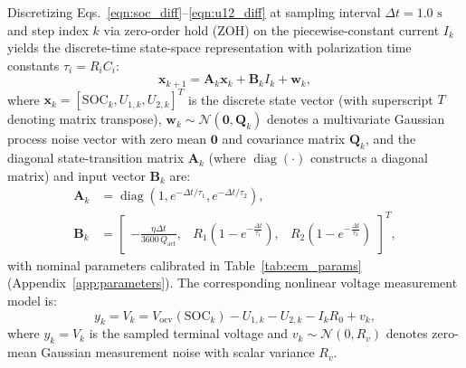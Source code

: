 \documentclass[10pt,a4paper]{article}
\begin{document}
Discretizing Eqs.~\eqref{eqn:soc_diff}--\eqref{eqn:u12_diff} at sampling interval $\Delta t = 1.0\text{ s}$ and step index $k$ via zero-order hold (ZOH) on the piecewise-constant current $I_k$ yields the discrete-time state-space representation with polarization time constants $\tau_i = R_i C_i$:
\begin{equation}\label{eqn:state_space_discrete}
\mathbf{x}_{k+1} = \mathbf{A}_k \mathbf{x}_k + \mathbf{B}_k I_k + \mathbf{w}_k,
\end{equation}
where $\mathbf{x}_k = [\text{SOC}_k, U_{1,k}, U_{2,k}]^T$ is the discrete state vector (with superscript $T$ denoting matrix transpose), $\mathbf{w}_k \sim \mathcal{N}(\mathbf{0}, \mathbf{Q}_k)$ denotes a multivariate Gaussian process noise vector with zero mean $\mathbf{0}$ and covariance matrix $\mathbf{Q}_k$, and the diagonal state-transition matrix $\mathbf{A}_k$ (where $\operatorname{diag}(\cdot)$ constructs a diagonal matrix) and input vector $\mathbf{B}_k$ are:
\begin{align}
\mathbf{A}_k &= \operatorname{diag}\left(1, e^{-\Delta t/\tau_1}, e^{-\Delta t/\tau_2}\right), \label{eqn:Ak_mat} \\
\mathbf{B}_k &= \begin{bmatrix}
-\frac{\eta \Delta t}{3600\,Q_{\text{act}}}, & R_1\left(1 - e^{-\frac{\Delta t}{\tau_1}}\right), & R_2\left(1 - e^{-\frac{\Delta t}{\tau_2}}\right)
\end{bmatrix}^T, \label{eqn:Bk_mat}
\end{align}
with nominal parameters calibrated in Table~\ref{tab:ecm_params} (Appendix~\ref{app:parameters}). The corresponding nonlinear voltage measurement model is:
\begin{equation}\label{eqn:measurement_eq}
y_k = V_k = V_{\text{ocv}}(\text{SOC}_k) - U_{1,k} - U_{2,k} - I_k R_0 + v_k,
\end{equation}
where $y_k = V_k$ is the sampled terminal voltage and $v_k \sim \mathcal{N}(0, R_v)$ denotes zero-mean Gaussian measurement noise with scalar variance $R_v$.
\end{document}
